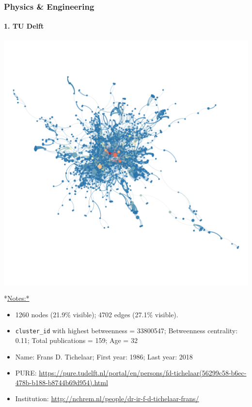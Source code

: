 \documentclass[]{article}
\providecommand{\tightlist}{%
  \setlength{\itemsep}{0pt}\setlength{\parskip}{0pt}}
\let\oldparagraph\paragraph
\renewcommand{\paragraph}[1]{\oldparagraph{#1}\mbox{}}
\begin{document}
\subsubsection{Physics \& Engineering}\label{physics-engineering}

\paragraph{1. TU Delft}\label{tu-delft}

\includegraphics{figs/tu_phys_betweenness.png}

*\url{Notes:*}

\begin{itemize}
\tightlist
\item
  1260 nodes (21.9\% visible); 4702 edges (27.1\% visible).
\item
  \texttt{cluster\_id} with highest betweenness = 33800547; Betweenness
  centrality: 0.11; Total publications = 159; Age = 32
\item
  Name: Frans D. Tichelaar; First year: 1986; Last year: 2018
\item
  PURE:
  \url{https://pure.tudelft.nl/portal/en/persons/fd-tichelaar(56299c58-b6ec-478b-b188-b8744b69d954).html}
\item
  Institution: \url{http://nchrem.nl/people/dr-ir-f-d-tichelaar-frans/}
\end{itemize}
\end{document}
